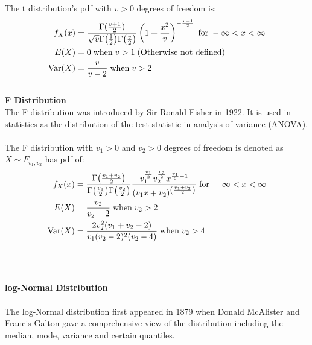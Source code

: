 \documentclass[,oneside]{article}
\begin{document}
\begin{enumerate}
The t distribution's pdf with $v > 0$ degrees of freedom is:
\begin{align*}
f_X(x)&=\frac{\Gamma(\frac{v+1}{2})}{\sqrt{v}\Gamma{\left (\frac{1}{2}\right )}\Gamma{\left (\frac{v}{2} \right )}}\left (1+\frac{x^2}{v} \right )^{-\frac{v+1}{2}}\hspace{0.1cm} \text{for} \hspace{0.1cm} -\infty < x < \infty \\
E(X)&=0 \hspace{0.1cm} \text{when} \hspace{0.1cm} v > 1\hspace{0.1cm}\text{(Otherwise not defined)}\\
\text{Var}(X)&=\frac{v}{v-2} \hspace{0.1cm} \text{when} \hspace{0.1cm} v > 2
\end{align*}\\
\textbf{F Distribution}\\
The F distribution was introduced by Sir Ronald Fisher in 1922. It is used in statistics as the distribution of the test statistic in analysis of variance (ANOVA). \\ \\
The F distribution with $v_1 > 0$ and $v_2 > 0$ degrees of freedom is denoted as $X \sim F_{v_1,v_2}$ has pdf of:
\begin{align*}
f_X(x)&=\frac{\Gamma{\left ( \frac{v_1+v_2}{2}\right )}}{\Gamma{\left ( \frac{v_1}{2} \right )}\Gamma{\left ( \frac{v_2}{2} \right )}} \frac{v_1^{\frac{v_1}{2}}v_2^{\frac{v_2}{2}}x^{\frac{v_1}{2}-1}}{(v_1 x + v_2)^{\left (\frac{v_1+v_2}{2} \right)}}\hspace{0.1cm} \text{for}\hspace{0.1cm} -\infty < x < \infty \\
E(X)&= \frac{v_2}{v_2-2}\hspace{0.1cm} \text{when}\hspace{0.1cm} v_2 > 2 \\
\text{Var}(X)&= \frac{2v_{2}^{2}(v_1+v_2-2)}{v_1(v_2-2)^2(v_2-4)}\hspace{0.1cm} \text{when}\hspace{0.1cm} v_2 > 4
\end{align*}\\ \\ \\
\textbf{log-Normal Distribution}\\ \\
The log-Normal distribution first appeared in 1879 when Donald McAlister and Francis Galton gave a comprehensive view of the distribution including the median, mode, variance and certain quantiles.\\ \\

\end{enumerate}
\end{document}
